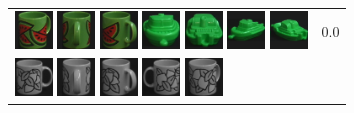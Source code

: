 \begin{figure}[tbp]
\begin{center}
\begin{tabular}{m{11cm} | m{3cm} |}
\includegraphics[width=1cm]{coil/beeld-33.eps}
\includegraphics[width=1cm]{coil/beeld-35.eps}
\includegraphics[width=1cm]{coil/beeld-34.eps}
\includegraphics[width=1cm]{coil/beeld-56.eps}
\includegraphics[width=1cm]{coil/beeld-59.eps}
\includegraphics[width=1cm]{coil/beeld-57.eps}
\includegraphics[width=1cm]{coil/beeld-58.eps}
& {\scriptsize 0.0}
\\
\includegraphics[width=1cm]{coil/beeld-48.eps}
\includegraphics[width=1cm]{coil/beeld-50.eps}
\includegraphics[width=1cm]{coil/beeld-49.eps}
\includegraphics[width=1cm]{coil/beeld-51.eps}
\includegraphics[width=1cm]{coil/beeld-53.eps}

\end{tabular}
\end{center}
\end{figure}
